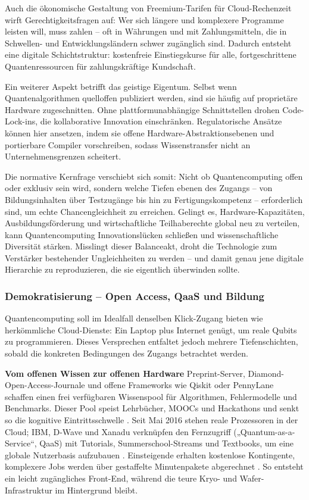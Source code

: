 Auch die ökonomische Gestaltung von Freemium-Tarifen für Cloud-Rechenzeit wirft Gerechtigkeitsfragen auf: Wer sich längere und komplexere Programme leisten will, muss zahlen – oft in Währungen und mit Zahlungsmitteln, die in Schwellen- und Entwicklungsländern schwer zugänglich sind. Dadurch entsteht eine digitale Schichtstruktur: kostenfreie Einstiegskurse für alle, fortgeschrittene Quantenressourcen für zahlungskräftige Kundschaft.

Ein weiterer Aspekt betrifft das geistige Eigentum. Selbst wenn Quantenalgorithmen quelloffen publiziert werden, sind sie häufig auf proprietäre Hardware zugeschnitten. Ohne plattformunabhängige Schnittstellen drohen Code-Lock-ins, die kollaborative Innovation einschränken. Regulatorische Ansätze können hier ansetzen, indem sie offene Hardware-Abstraktionsebenen und portierbare Compiler vorschreiben, sodass Wissenstransfer nicht an Unternehmensgrenzen scheitert.

Die normative Kernfrage verschiebt sich somit: Nicht ob Quantencomputing offen oder exklusiv sein wird, sondern welche Tiefen ebenen des Zugangs – von Bildungsinhalten über Testzugänge bis hin zu Fertigungskompetenz – erforderlich sind, um echte Chancengleichheit zu erreichen. Gelingt es, Hardware-Kapazitäten, Ausbildungsförderung und wirtschaftliche Teilhaberechte global neu zu verteilen, kann Quantencomputing Innovationslücken schließen und wissenschaftliche Diversität stärken. Misslingt dieser Balanceakt, droht die Technologie zum Verstärker bestehender Ungleichheiten zu werden – und damit genau jene digitale Hierarchie zu reproduzieren, die sie eigentlich überwinden sollte. \cite{seskirDemocratizationQuantumTechnologies2022}
\subsubsection{Demokratisierung – Open Access, QaaS und Bildung}
Quantencomputing soll im Idealfall denselben Klick-Zugang bieten wie herkömmliche Cloud-Dienste: Ein Laptop plus Internet genügt, um reale Qubits zu programmieren. Dieses Versprechen entfaltet jedoch mehrere Tiefenschichten, sobald die konkreten Bedingungen des Zugangs betrachtet werden.

\textbf{Vom offenen Wissen zur offenen Hardware}
Preprint-Server, Diamond-Open-Access-Journale und offene Frameworks wie Qiskit oder PennyLane schaffen einen frei verfügbaren Wissenspool für Algorithmen, Fehlermodelle und Benchmarks. Dieser Pool speist Lehrbücher, MOOCs und Hackathons und senkt so die kognitive Eintrittsschwelle .
Seit Mai 2016 stehen reale Prozessoren in der Cloud; IBM, D-Wave und Xanadu verknüpfen den Fernzugriff („Quantum-as-a-Service“, QaaS) mit Tutorials, Summerschool-Streams und Textbooks, um eine globale Nutzerbasis aufzubauen . Einsteigende erhalten kostenlose Kontingente, komplexere Jobs werden über gestaffelte Minutenpakete abgerechnet . So entsteht ein leicht zugängliches Front-End, während die teure Kryo- und Wafer-Infrastruktur im Hintergrund bleibt.\cite{seskirDemocratizationQuantumTechnologies2022}

